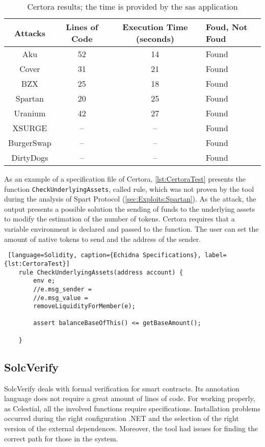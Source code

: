 \begin{center}
    \begin{table*}
        \caption{Certora results; the time is provided by the sas application}
            \label{tab:CertoraTable}
            \begin{tabular}{cccl}
            \toprule
                Attacks & Lines of Code & Execution Time (seconds) & Foud, Not Foud\\
                \midrule
                Aku & 52 & 14 & Found \\ 
                Cover & 31 & 21 & Found\\ 
                BZX & 25  & 18 & Found\\ 
                Spartan & 20  & 25 & Found\\ 
                Uranium & 42 & 27  & Found\\ 
                XSURGE &  -- & -- & Found\\  
                BurgerSwap &  -- & --& Found\\ 
                DirtyDogs &  -- & -- & Found\\
            \bottomrule
            \end{tabular}
    \end{table*}
\end{center}

As an example of a specification file of Certora, \autoref{lst:CertoraTest} presents the function \texttt{CheckUnderlyingAssets}, called rule, which was not proven by the tool during the analysis of Spart Protocol (\autoref{sec:Exploits:Spartan}).
As the attack, the output presents a possible solution the sending of funds to the underlying assets to modify the estimation of the number of tokens. 
Certora requires that a variable environment is declared and passed to the function. 
The user can set the amount of native tokens to send and the address of the sender.

\begin{lstlisting} [language=Solidity, caption={Echidna Specifications}, label={lst:CertoraTest}]
    rule CheckUnderlyingAssets(address account) {
        env e;
        //e.msg_sender = 
        //e.msg_value = 
        removeLiquidityForMember(e);
    
        assert balanceBaseOfThis() <= getBaseAmount();
    
    }
\end{lstlisting} 

\subsection*{SolcVerify} SolcVerify deals with formal verification for smart contracts.
Its annotation language does not require a great amount of lines of code.
For working properly, as Celestial, all the involved functions require specifications.
Installation problems occurred during the right configuration .NET and the selection of the right version of the external dependences.
Moreover, the tool had issues for finding the correct path for those in the system.

